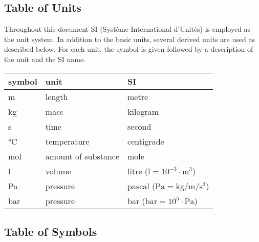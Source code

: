 \documentclass[12pt]{article}
\begin{document}
\subsection{Table of Units}

Throughout this document SI (Syst\`{e}me International d'Unit\'{e}s) is employed 
as the unit system.  In addition to the basic units, several derived units are
used as described below.  For each unit, the symbol is given followed by a
description of the unit and the SI name.
~\newline

\renewcommand{\arraystretch}{1.2}
  \noindent \begin{tabular}{l l l} 
    \toprule		
    \textbf{symbol} & \textbf{unit} & \textbf{SI}\\
    \midrule 
    \si{\metre} & length & metre\\
    \si{\kilogram} & mass & kilogram\\
    \si{\second} & time & second\\
    \si{\celsius} & temperature & centigrade\\
    \si{\mole} & amount of substance & mole\\
    \si{\litre} & volume & litre 
      ($\si{\litre} = 10^{-3}\cdot\si{\cubic\metre}$)\\
    \si{\pascal} & pressure & pascal 
      ($\si{\pascal} = \si{\kilogram\per\metre\per\square\second}$)\\
    \si{\bar} & pressure & bar ($\si{\bar} = 10^{5}\cdot\si{\pascal}$)\\
    \bottomrule
  \end{tabular}

\subsection{Table of Symbols}
\end{document}

